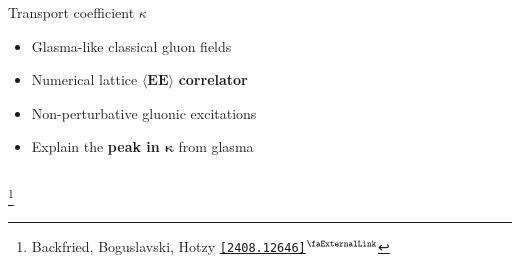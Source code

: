 \documentclass[aspectratio=169,11pt,usenames,dvipsnames]{beamer}
\renewcommand{\thefootnote}{\color{customblue}\faPaperPlaneO}
\newcommand\blfootnote[1]{%
  \begingroup
  \renewcommand\thefootnote{}\footnote{#1}%
  \addtocounter{footnote}{-1}%
  \endgroup
}
\begin{document}
\begin{frame}[t,noframenumbering]
\begin{columns}[onlytextwidth,t]
        \begin{center}
            {\Large\color{palteal} Transport coefficient $\kappa$ \\[10pt]}
            \footnotesize
                \begin{itemize}
                    \item {\color{lightgray}Glasma-like classical gluon fields}
                    \item {\color{lightgray}Numerical lattice $\boldsymbol{\langle EE\rangle}$ {\bfseries  correlator}}
                    \item {\color{lightgray}Non-perturbative gluonic excitations}
                    \item {\color{lightgray}Explain the {\bfseries peak in $\boldsymbol{\kappa}$} from glasma}
                \end{itemize}
        \end{center}
    \end{columns}
    \blfootnote{\scriptsize Backfried, Boguslavski, Hotzy \href{https://arxiv.org/abs/2408.12646}{\color{palgold}\texttt{[2408.12646]}$^\text{\scalebox{0.9}{\faExternalLink}}$}}
\end{frame}


\end{document}
